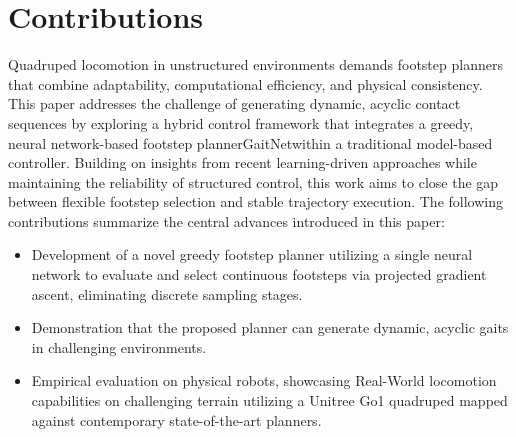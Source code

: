 \section{Contributions}
\label{sec:introduction-contributions}

Quadruped locomotion in unstructured environments demands footstep
planners that combine adaptability, computational efficiency, and
physical consistency. This paper addresses the challenge of
generating dynamic, acyclic contact sequences by exploring a hybrid
control framework that integrates a greedy, neural network-based
footstep planner\textemdash GaitNet\textemdash within a traditional
model-based controller. Building on insights from recent
learning-driven approaches while maintaining the reliability of
structured control, this work aims to close the gap between flexible
footstep selection and stable trajectory execution. The following
contributions summarize the central advances introduced in this paper:

\begin{itemize}
  \item Development of a novel greedy footstep planner utilizing a single
    neural network to evaluate and select continuous footsteps via
    projected gradient ascent, eliminating discrete sampling stages.
  \item Demonstration that the proposed planner can generate dynamic,
    acyclic gaits in challenging environments.
  \item Empirical evaluation on physical robots, showcasing Real-World
    locomotion capabilities on challenging terrain utilizing a Unitree Go1 
    quadruped mapped against contemporary state-of-the-art planners.
\end{itemize}
